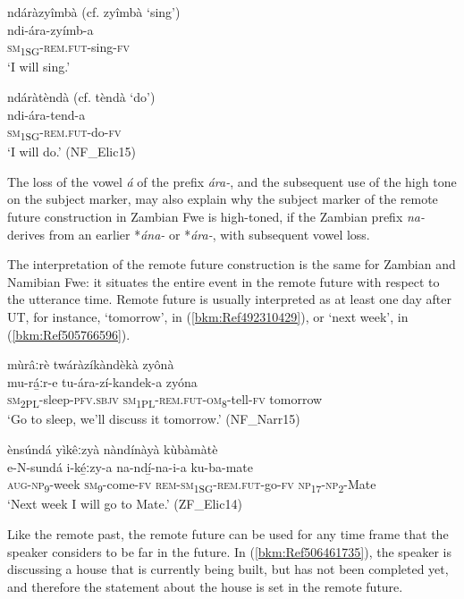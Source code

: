 \ea
\label{bkm:Ref99972951}
ndáràzyîmbà (cf. zyîmbà  ‘sing’)\\
\gll ndi-ára-zyímb-a\\
\textsc{sm}\textsubscript{1SG}-\textsc{rem}.\textsc{fut}-sing-\textsc{fv}\\
\glt ‘I will sing.’
\z

\ea
\label{bkm:Ref99972953}
ndáràtèndà (cf. tèndà ‘do’)\\
\gll ndi-ára-tend-a\\
\textsc{sm}\textsubscript{1SG}-\textsc{rem}.\textsc{fut}-do-\textsc{fv}\\
\glt ‘I will do.’ (NF\_Elic15)
\z

The loss of the vowel \textit{á} of the prefix \textit{ára-}, and the subsequent use of the high tone on the subject marker, may also explain why the subject marker of the remote future construction in Zambian Fwe is high-toned, if the Zambian prefix \textit{na-} derives from an earlier *\textit{ána-} or *\textit{ára\--}, with subsequent vowel loss.

The interpretation of the remote future construction is the same for Zambian and Namibian Fwe: it situates the entire event in the remote future with respect to the utterance time. Remote future is usually interpreted as at least one day after UT, for instance, ‘tomorrow’, in (\ref{bkm:Ref492310429}), or ‘next week’, in (\ref{bkm:Ref505766596}).

\ea
\label{bkm:Ref492310429}
mùrâːrè twáràzíkàndèkà zyônà\\
\gll mu-rá̲ːr-e      tu-ára-zí-kandek-a      zyóna\\
\textsc{sm}\textsubscript{2PL}-sleep-\textsc{pfv}.\textsc{sbjv}  \textsc{sm}\textsubscript{1PL}-\textsc{rem}.\textsc{fut}-\textsc{om}\textsubscript{8}-tell-\textsc{fv}  tomorrow\\
\glt ‘Go to sleep, we’ll discuss it tomorrow.’ (NF\_Narr15)
\z

\ea
\label{bkm:Ref505766596}
ènsúndá yìkêːzyà nàndínàyà kùbàmàtè\\
\gll e-N-sundá    i-ké̲ːzy-a    na-ndí̲-na-i-a ku-ba-mate \\
\textsc{aug}-\textsc{np}\textsubscript{9}-week  \textsc{sm}\textsubscript{9}-come-\textsc{fv}  \textsc{rem}-\textsc{sm}\textsubscript{1SG}-\textsc{rem}.\textsc{fut}-go-\textsc{fv}
\textsc{np}\textsubscript{17}-\textsc{np}\textsubscript{2}-Mate\\
\glt ‘Next week I will go to Mate.’ (ZF\_Elic14)
\z

Like the remote past, the remote future can be used for any time frame that the speaker considers to be far in the future. In (\ref{bkm:Ref506461735}), the speaker is discussing a house that is currently being built, but has not been completed yet, and therefore the statement about the house is set in the remote future.

